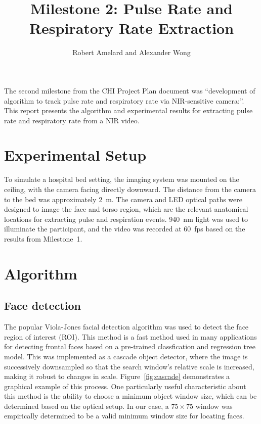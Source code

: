 \documentclass{article}
\begin{document}
\title{Milestone 2: Pulse Rate and Respiratory Rate Extraction}
\author{Robert Amelard and Alexander Wong}
\maketitle

\noindent The second milestone from the CHI Project Plan document was ``development of algorithm to track pulse rate and respiratory rate via NIR-sensitive camera:''. This report presents the algorithm and experimental results for extracting pulse rate and respiratory rate from a NIR video.

\section{Experimental Setup}
To simulate a hospital bed setting, the imaging system was mounted on the ceiling, with the camera facing directly downward. The distance from the camera to the bed was approximately 2~m. The camera and LED optical paths were designed to image the face and torso region, which are the relevant anatomical locations for extracting pulse and respiration events. 940~nm light was used to illuminate the participant, and the video was recorded at 60~fps based on the results from Milestone~1.

\section{Algorithm}

\subsection{Face detection}
The popular Viola-Jones facial detection algorithm was used to detect the face region of interest (ROI). This method is a fast method used in many applications for detecting frontal faces based on a pre-trained classfication and regression tree model. This was implemented as a cascade object detector, where the image is successively downsampled so that the search window's relative scale is increased, making it robust to changes in scale. Figure~\ref{fig:cascade} demonstrates a graphical example of this process. One particularly useful characteristic about this method is the ability to choose a minimum object window size, which can be determined based on the optical setup. In our case, a $75 \times 75$ window was empirically determined to be a valid minimum window size for locating faces.
\end{document}
